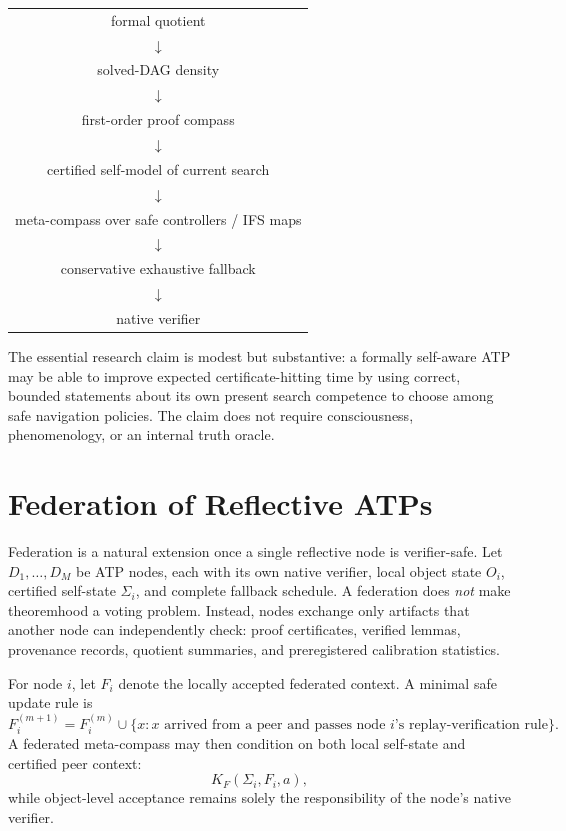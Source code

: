 \documentclass[11pt]{article}
\begin{document}
\begin{resultbox}
\begin{center}
\begin{tabular}{c}
formal quotient \\
$\downarrow$ \\
solved-DAG density \\
$\downarrow$ \\
first-order proof compass \\
$\downarrow$ \\
certified self-model of current search \\
$\downarrow$ \\
meta-compass over safe controllers / IFS maps \\
$\downarrow$ \\
conservative exhaustive fallback \\
$\downarrow$ \\
native verifier
\end{tabular}
\end{center}
\end{resultbox}

The essential research claim is modest but substantive: a formally self-aware ATP may be able to improve expected certificate-hitting time by using correct, bounded statements about its own present search competence to choose among safe navigation policies. The claim does not require consciousness, phenomenology, or an internal truth oracle.

\section{Federation of Reflective ATPs}
Federation is a natural extension once a single reflective node is verifier-safe. Let $D_1,\ldots,D_M$ be ATP nodes, each with its own native verifier, local object state $O_i$, certified self-state $\Sigma_i$, and complete fallback schedule. A federation does \emph{not} make theoremhood a voting problem. Instead, nodes exchange only artifacts that another node can independently check: proof certificates, verified lemmas, provenance records, quotient summaries, and preregistered calibration statistics.

For node $i$, let $F_i$ denote the locally accepted federated context. A minimal safe update rule is
\[
F_i^{(m+1)}=F_i^{(m)}\cup\{x:\text{$x$ arrived from a peer and passes node $i$'s replay-verification rule}\}.
\]
A federated meta-compass may then condition on both local self-state and certified peer context:
\[
K_F(\Sigma_i,F_i,a),
\]
while object-level acceptance remains solely the responsibility of the node's native verifier.
\end{document}
